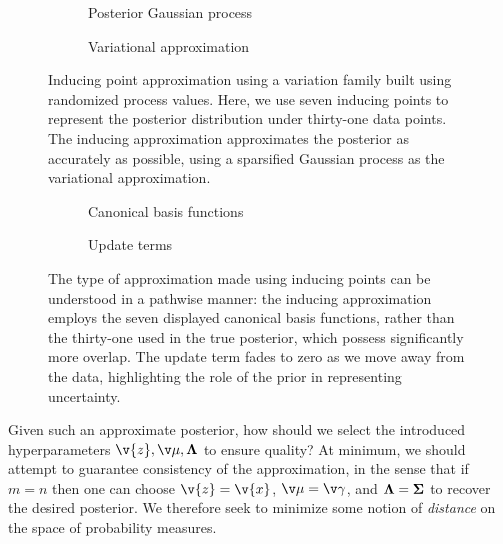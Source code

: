 \documentclass[11pt]{book}
\begin{document}
\begin{figure}
\begin{subfigure}{0.98\textwidth}

\end{subfigure}
\begin{subfigure}{0.49\textwidth}

\caption{Posterior Gaussian process}
\end{subfigure}
\begin{subfigure}{0.49\textwidth}

\caption{Variational approximation}
\end{subfigure}
\caption[Variational approximations of Gaussian processes]{Inducing point approximation using a variation family built using randomized process values. Here, we use seven inducing points to represent the posterior distribution under thirty-one data points. 
The inducing approximation approximates the posterior as accurately as possible, using a sparsified Gaussian process as the variational approximation.}
\label{fig:gp-ip-approx}
\end{figure}


\begin{figure}
\begin{subfigure}{0.49\textwidth}

\caption{Canonical basis functions}
\end{subfigure}
\begin{subfigure}{0.49\textwidth}

\caption{Update terms}
\end{subfigure}
\caption[Canonical basis functions]{The type of approximation made using inducing points can be understood in a pathwise manner: the inducing approximation employs the seven displayed canonical basis functions, rather than the thirty-one used in the true posterior, which possess significantly more overlap.
The update term fades to zero as we move away from the data, highlighting the role of the prior in representing uncertainty.}
\label{fig:gp-ip}
\end{figure}

Given such an approximate posterior, how should we select the introduced hyperparameters $\v{z},\v\mu,\m\Lambda$ to ensure quality?
At minimum, we should attempt to guarantee consistency of the approximation, in the sense that if $m = n$ then one can choose $\v{z} = \v{x}$, $\v\mu = \v\gamma$, and $\m\Lambda = \m\Sigma$ to recover the desired posterior.
We therefore seek to minimize some notion of \emph{distance} on the space of probability measures.
\end{document}
